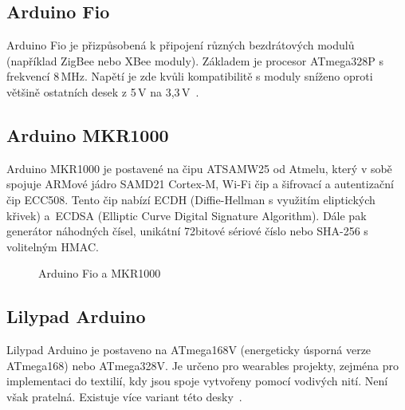 		
		\subsection{Arduino Fio} 
		Arduino Fio je přizpůsobená k připojení různých bezdrátových modulů (například ZigBee nebo XBee moduly). Základem je procesor ATmega328P s frekvencí 8\,MHz. Napětí je zde kvůli kompatibilitě s moduly sníženo oproti většině ostatních desek z 5\,V na 3,3\,V~\cite{ArduinoFio}.	
		
	\subsection{Arduino MKR1000}
	Arduino MKR1000 je postavené na čipu ATSAMW25 od Atmelu, který v sobě spojuje ARMové jádro SAMD21 Cortex-M, Wi-Fi čip a šifrovací a autentizační čip ECC508. Tento čip nabízí ECDH (Diffie-Hellman s využitím eliptických křivek) a~ECDSA (Elliptic Curve Digital Signature Algorithm). Dále pak generátor náhodných čísel, unikátní 72bitové sériové číslo nebo SHA-256 s volitelným HMAC.
	
	
	\begin{figure}[!ht]
    \centering
			\hspace*{5mm}
		\caption{Arduino Fio a MKR1000}
		\vspace{-30pt}	
\end{figure}
	
		\subsection{Lilypad Arduino} 
		Lilypad Arduino je postaveno na ATmega168V (energeticky úsporná verze ATmega168) nebo ATmega328V. Je určeno pro wearables projekty, zejména pro implementaci do textilií, kdy jsou spoje vytvořeny pomocí vodivých nití. Není však pratelná. Existuje více variant této desky~\cite{ArduinoLilipad}.	
	
